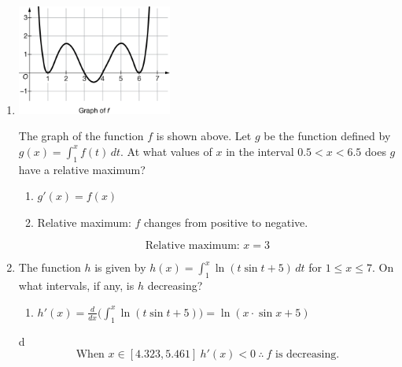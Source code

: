 \documentclass[12pt]{article}
\begin{document}
\begin{enumerate}
\item 
\begin{center}
    \includegraphics[width=2in]{original-21.png}
\end{center}
The graph of the function $f$ is shown above. Let $g$ be the function defined by $g(x)=\int_{1}^{x} f(t) \, dt$. At what values of $x$ in the interval $0.5<x<6.5$ does $g$ have a relative maximum?
\begin{enumerate}
    \item $g'(x)=f(x)$
    \item Relative maximum: $f$ changes from positive to negative.
\end{enumerate}
$$\boxed{\text{Relative maximum: } x=3}$$
\item The function $h$ is given by $h(x)=\int_{1}^{x} \ln(t\sin t +5) \, dt$ for $1 \leq x \leq 7$. On what intervals, if any, is $h$ decreasing?
\begin{enumerate}
    \item $h'(x)=\frac{d}{dx} \big(\int_{1}^{x} \ln(t\sin t +5) \big)=\ln(x \cdot \sin x +5)$
\end{enumerate}d
    $$\boxed{\text{When } x\in[4.323,5.461] \: h'(x)<0 \: \therefore \: f \text{ is decreasing.}}$$
\end{enumerate}
\end{document}
